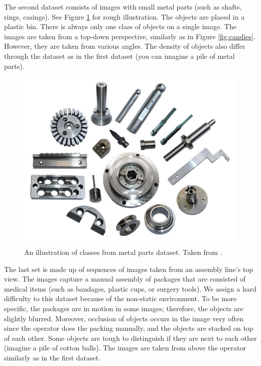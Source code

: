  The second dataset consists of images with small
metal parts (such as shafts, rings, casings). See Figure \ref{fig:parts} for
rough illustration. The objects are placed in a plastic bin. There is always
only one class of objects on a single image. The images are taken from a
top-down perspective, similarly as in Figure \ref{fig:candies}. However, they
are taken from various angles. The density of objects also differ through the
dataset as in the first dataset (you can imagine a pile of metal parts).

\begin{figure}[ht]
	\centering
	\includegraphics[height=0.35\linewidth]{Sources/Figures/metal_parts.jpg}
	\caption{An illustration of classes from metal parts dataset. Taken from
		\cite{parts}.}
	\label{fig:parts}
\end{figure}

 The last set is made up of sequences of images
taken from an assembly line's top view. The images capture a manual assembly of
packages that are consisted of medical items (such as bandages, plastic cups, or
surgery tools). We assign a hard difficulty to this dataset because of the
non-static environment. To be more specific, the packages are in motion in some
images; therefore, the objects are slightly blurred. Moreover, occlusion of
objects occurs in the image very often since the operator does the packing
manually, and the objects are stacked on top of each other. Some objects are
tough to distinguish if they are next to each other (imagine a pile of cotton
balls). The images are taken from above the operator similarly as in the first
dataset.

